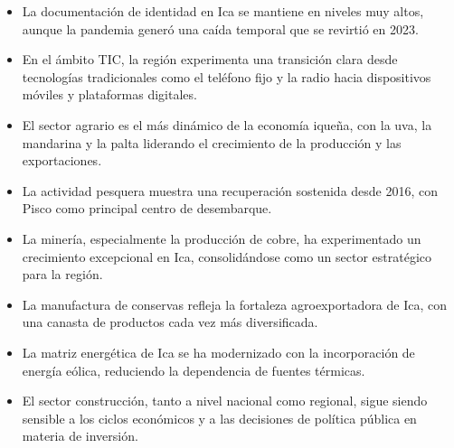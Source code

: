 \documentclass[12pt]{article}
\begin{document}
\begin{itemize}
    \item La documentación de identidad en Ica se mantiene en niveles
    muy altos, aunque la pandemia generó una caída temporal que se
    revirtió en 2023.

    \item En el ámbito TIC, la región experimenta una transición clara
    desde tecnologías tradicionales como el teléfono fijo y la radio
    hacia dispositivos móviles y plataformas digitales.

    \item El sector agrario es el más dinámico de la economía iqueña,
    con la uva, la mandarina y la palta liderando el crecimiento
    de la producción y las exportaciones.

    \item La actividad pesquera muestra una recuperación sostenida
    desde 2016, con Pisco como principal centro de desembarque.

    \item La minería, especialmente la producción de cobre, ha
    experimentado un crecimiento excepcional en Ica, consolidándose
    como un sector estratégico para la región.

    \item La manufactura de conservas refleja la fortaleza
    agroexportadora de Ica, con una canasta de productos cada vez
    más diversificada.

    \item La matriz energética de Ica se ha modernizado con la
    incorporación de energía eólica, reduciendo la dependencia
    de fuentes térmicas.

    \item El sector construcción, tanto a nivel nacional como
    regional, sigue siendo sensible a los ciclos económicos y
    a las decisiones de política pública en materia de inversión.
\end{itemize}
\end{document}
